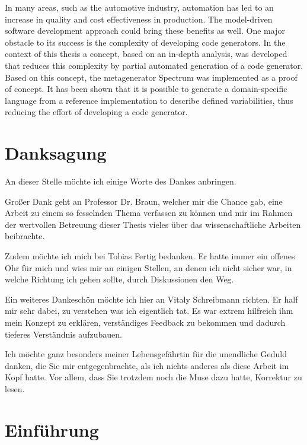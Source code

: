\documentclass[12pt,oneside,a4paper,parskip]{scrbook}
\begin{document}
In many areas, such as the automotive industry, automation has led to an increase in quality and cost effectiveness in production. The model-driven software development approach could bring these benefits as well. One major obstacle to its success is the complexity of developing code generators. In the context of this thesis a concept, based on an in-depth analysis, was developed that reduces this complexity by partial automated generation of a code generator. Based on this concept, the metagenerator Spectrum was implemented as a proof of concept. It has been shown that it is possible to generate a domain-specific language from a reference implementation to describe defined variabilities, thus reducing the effort of developing a code generator.

\newpage
\chapter*{Danksagung}

An dieser Stelle möchte ich einige Worte des Dankes anbringen.

Großer Dank geht an Professor Dr. Braun, welcher mir die Chance gab, eine Arbeit zu einem so fesselnden Thema verfassen zu können und mir im Rahmen der wertvollen Betreuung dieser Thesis vieles über das wissenschaftliche Arbeiten beibrachte.

Zudem möchte ich mich bei Tobias Fertig bedanken. Er hatte immer ein offenes Ohr für mich und wies mir an einigen Stellen, an denen ich nicht sicher war, in welche Richtung ich gehen sollte, durch Diskussionen den Weg.

Ein weiteres Dankeschön möchte ich hier an Vitaly Schreibmann richten. Er half mir sehr dabei, zu verstehen was ich eigentlich tat. Es war extrem hilfreich ihm mein Konzept zu erklären, verständiges Feedback zu bekommen und dadurch tieferes Verständnis aufzubauen.

Ich möchte ganz besonders meiner Lebensgefährtin für die unendliche Geduld danken, die Sie mir entgegenbrachte, als ich nichts anderes als diese Arbeit im Kopf hatte. Vor allem, dass Sie trotzdem noch die Muse dazu hatte, Korrektur zu lesen.

\tableofcontents



\mainmatter


\chapter{Einführung}\label{ch:intro}
\end{document}

